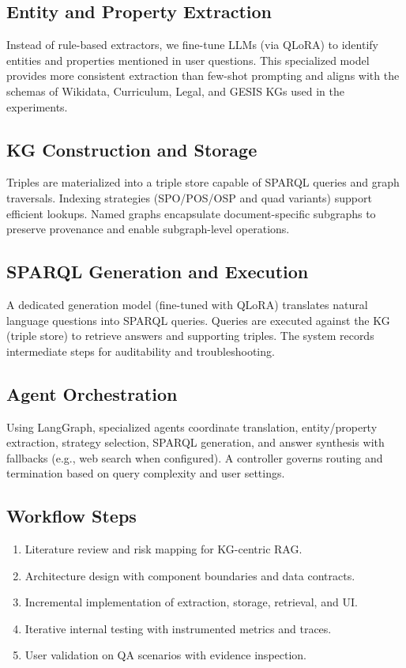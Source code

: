 \documentclass[12pt,a4paper,onecolumn]{article}
\begin{document}
\subsection*{Entity and Property Extraction}
Instead of rule-based extractors, we fine-tune LLMs (via QLoRA) to identify entities and properties mentioned in user questions. This specialized model provides more consistent extraction than few-shot prompting and aligns with the schemas of Wikidata, Curriculum, Legal, and GESIS KGs used in the experiments.

\subsection*{KG Construction and Storage}
Triples are materialized into a triple store capable of SPARQL queries and graph traversals. Indexing strategies (SPO/POS/OSP and quad variants) support efficient lookups. Named graphs encapsulate document-specific subgraphs to preserve provenance and enable subgraph-level operations.

\subsection*{SPARQL Generation and Execution}
A dedicated generation model (fine-tuned with QLoRA) translates natural language questions into SPARQL queries. Queries are executed against the KG (triple store) to retrieve answers and supporting triples. The system records intermediate steps for auditability and troubleshooting.

\subsection*{Agent Orchestration}
Using LangGraph, specialized agents coordinate translation, entity/property extraction, strategy selection, SPARQL generation, and answer synthesis with fallbacks (e.g., web search when configured). A controller governs routing and termination based on query complexity and user settings.

\subsection*{Workflow Steps}
\begin{enumerate}[leftmargin=*, label=\arabic*., itemsep=0.4\baselineskip]
  \item Literature review and risk mapping for KG-centric RAG.
  \item Architecture design with component boundaries and data contracts.
  \item Incremental implementation of extraction, storage, retrieval, and UI.
  \item Iterative internal testing with instrumented metrics and traces.
  \item User validation on QA scenarios with evidence inspection.
\end{enumerate}
\end{document}
